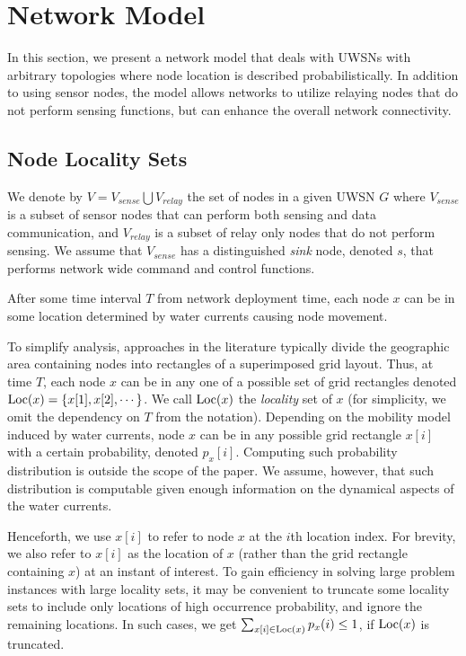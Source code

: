 
\section{Network Model}

In this section, we present a network model that deals with UWSNs with
arbitrary topologies where node location is described probabilistically.
%
In addition to using sensor nodes, the model allows networks to utilize
relaying nodes that do not perform sensing functions, but can enhance
the overall network connectivity.

\subsection{Node Locality Sets}

We denote by $V= V_{sense} \bigcup V_{relay}$ the set of nodes in
a given UWSN $G$ where $V_{sense}$ is a subset of sensor nodes that
can perform both sensing and data communication, and $V_{relay}$ is
a subset of relay only nodes that do not perform sensing.
%
We assume that $V_{sense}$ has a distinguished {\em sink} node,
denoted $s$, that performs network wide command and control functions.


After some time interval $T$ from network deployment time,
each node $x$ can be in some location determined by water currents
causing node movement.


To simplify analysis, approaches in the literature typically divide
the geographic area containing nodes into rectangles of a superimposed
grid layout.
%
Thus, at time $T$, each node $x$ can be in any one of a possible
set of grid rectangles denoted ${\mathrm {Loc}}(x)= \{ x[1], x[2], \cdots \}$.
%
We call ${\mathrm {Loc}}(x)$ the {\em locality} set of $x$ (for simplicity,
we omit the dependency on $T$ from the notation).
%
Depending on the mobility model induced by water currents, node $x$
can be in any possible grid rectangle $x[i]$ with a certain probability,
denoted $p_x[i]$. 
%
Computing such probability distribution is outside the scope of the paper.
We assume, however, that such distribution is computable given enough
information on the dynamical aspects of the water currents.

Henceforth, we use $x[i]$ to refer to node $x$ at the $i$th location index.
%
For brevity, we also refer to $x[i]$ as the location of $x$
(rather than the grid rectangle containing $x$) at an instant of interest.
%
To gain efficiency in solving large problem instances with large locality
sets, it may be convenient to truncate some locality sets to include only
locations of high occurrence probability, and ignore the remaining locations.
%
In such cases, we get $\sum_{x[i] \in {\mathrm {Loc}}(x)} p_x(i) \leq 1$, if ${\mathrm {Loc}}(x)$
is truncated.

